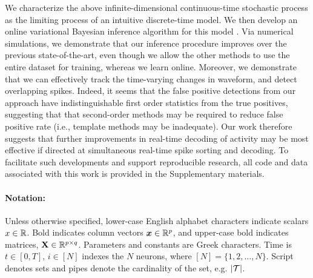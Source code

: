 We characterize the above infinite-dimensional continuous-time stochastic process as the limiting process of an intuitive discrete-time model.  
We then develop an online variational Bayesian inference algorithm for this model \cite{??}.  Via numerical simulations, we demonstrate that our inference procedure improves over the previous state-of-the-art, even though we allow the other methods to use the entire dataset for training, whereas we learn online.  Moreover, we demonstrate that we can effectively track the time-varying changes in waveform, and detect overlapping spikes.  Indeed, it seems that the false positive detections from our approach have indistinguishable first order statistics from the true positives, suggesting that that second-order methods may be required to reduce false positive rate (i.e., template methods may be inadequate).  Our work therefore suggests that further improvements in real-time decoding of activity may be most effective if directed at simultaneous real-time spike sorting and decoding.  To facilitate such developments and support reproducible research, all code and data associated with this work is provided in the Supplementary materials.


\paragraph{\textbf{Notation: }}
Unless otherwise specified, lower-case English alphabet characters indicate scalars $x \in \mathbb{R}$. Bold indicates column vectors $\boldsymbol{x} \in \mathbb{R}^p$,
and upper-case bold indicates matrices, $\mathbf{X} \in \mathbb{R}^{p \times q}$.  Parameters and constants are Greek characters.  Time is $t \in [0,T]$, 
$i \in [N]$ indexes the $N$ neurons, where $[N]=\{1,2,\ldots,N\}$. Script denotes sets and pipes denote the cardinality of the set, e.g. $|\mathcal{T}|$.  
\vspace{-.1in}

